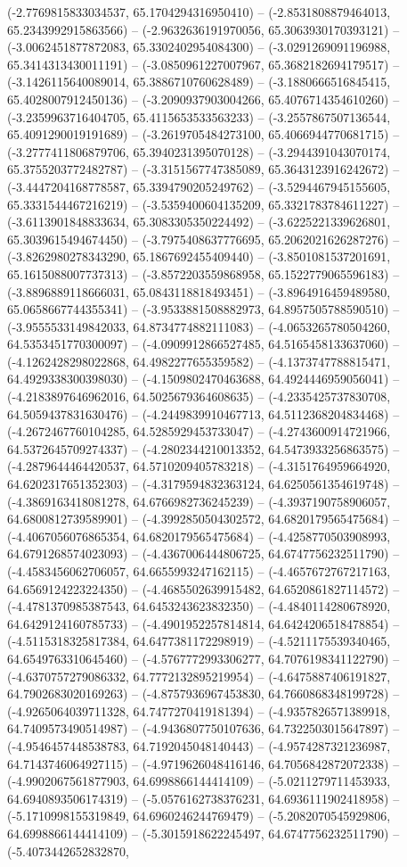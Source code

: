 (-2.7769815833034537, 65.1704294316950410) -- (-2.8531808879464013, 65.2343992915863566) -- (-2.9632636191970056, 65.3063930170393121) -- (-3.0062451877872083, 65.3302402954084300) -- (-3.0291269091196988, 65.3414313430011191) -- (-3.0850961227007967, 65.3682182694179517) -- (-3.1426115640089014, 65.3886710760628489) -- (-3.1880666516845415, 65.4028007912450136) -- (-3.2090937903004266, 65.4076714354610260) -- (-3.2359963716404705, 65.4115653533563233) -- (-3.2557867507136544, 65.4091290019191689) -- (-3.2619705484273100, 65.4066944770681715) -- (-3.2777411806879706, 65.3940231395070128) -- (-3.2944391043070174, 65.3755203772482787) -- (-3.3151567747385089, 65.3643123916242672) -- (-3.4447204168778587, 65.3394790205249762) -- (-3.5294467945155605, 65.3331544467216219) -- (-3.5359400604135209, 65.3321783784611227) -- (-3.6113901848833634, 65.3083305350224492) -- (-3.6225221339626801, 65.3039615494674450) -- (-3.7975408637776695, 65.2062021626287276) -- (-3.8262980278343290, 65.1867692455409440) -- (-3.8501081537201691, 65.1615088007737313) -- (-3.8572203559868958, 65.1522779065596183) -- (-3.8896889118666031, 65.0843118818493451) -- (-3.8964916459489580, 65.0658667744355341) -- (-3.9533881508882973, 64.8957505788590510) -- (-3.9555533149842033, 64.8734774882111083) -- (-4.0653265780504260, 64.5353451770300097) -- (-4.0909912866527485, 64.5165458133637060) -- (-4.1262428298022868, 64.4982277655359582) -- (-4.1373747788815471, 64.4929338300398030) -- (-4.1509802470463688, 64.4924446959056041) -- (-4.2183897646962016, 64.5025679364608635) -- (-4.2335425737830708, 64.5059437831630476) -- (-4.2449839910467713, 64.5112368204834468) -- (-4.2672467760104285, 64.5285929453733047) -- (-4.2743600914721966, 64.5372645709274337) -- (-4.2802344210013352, 64.5473933256863575) -- (-4.2879644464420537, 64.5710209405783218) -- (-4.3151764959664920, 64.6202317651352303) -- (-4.3179594832363124, 64.6250561354619748) -- (-4.3869163418081278, 64.6766982736245239) -- (-4.3937190758906057, 64.6800812739589901) -- (-4.3992850504302572, 64.6820179565475684) -- (-4.4067056076865354, 64.6820179565475684) -- (-4.4258770503908993, 64.6791268574023093) -- (-4.4367006444806725, 64.6747756232511790) -- (-4.4583456062706057, 64.6655993247162115) -- (-4.4657672767217163, 64.6569124223224350) -- (-4.4685502639915482, 64.6520861827114572) -- (-4.4781370985387543, 64.6453243623832350) -- (-4.4840114280678920, 64.6429124160785733) -- (-4.4901952257814814, 64.6424206518478854) -- (-4.5115318325817384, 64.6477381172298919) -- (-4.5211175539340465, 64.6549763310645460) -- (-4.5767772993306277, 64.7076198341122790) -- (-4.6370757279086332, 64.7772132895219954) -- (-4.6475887406191827, 64.7902683020169263) -- (-4.8757936967453830, 64.7660868348199728) -- (-4.9265064039711328, 64.7477270419181394) -- (-4.9357826571389918, 64.7409573490514987) -- (-4.9436807750107636, 64.7322503015647897) -- (-4.9546457448538783, 64.7192045048140443) -- (-4.9574287321236987, 64.7143746064927115) -- (-4.9719626048416146, 64.7056842872072338) -- (-4.9902067561877903, 64.6998866144414109) -- (-5.0211279711453933, 64.6940893506174319) -- (-5.0576162738376231, 64.6936111902418958) -- (-5.1710998155319849, 64.6960246244769479) -- (-5.2082070545929806, 64.6998866144414109) -- (-5.3015918622245497, 64.6747756232511790) -- (-5.4073442652832870, 